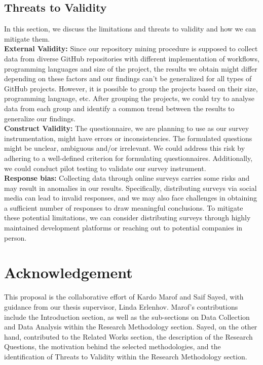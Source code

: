 \documentclass[conference]{IEEEtran}
\begin{document}
    \subsection{Threats to Validity}
        In this section, we discuss the limitations and threats to
        validity and how we can mitigate them.\\

        \textbf{External Validity:} Since our repository mining procedure is supposed to collect data from diverse GitHub repositories with different implementation of workflows, programming languages and size of the project, the results we obtain might differ depending on these factors and our findings can’t be generalized for all types of GitHub projects. However, it is possible to group the projects based on their size, programming language, etc. After grouping the projects, we could try to analyse data from each group and identify a common trend between the results to generalize our findings.\\

	\textbf{Construct Validity:} The questionnaire, we are planning to use as our survey instrumentation, might have errors or inconsistencies. The formulated questions might be unclear, ambiguous and/or irrelevant. We could address this risk by adhering to a well-defined criterion for formulating questionnaires. Additionally, we could conduct pilot testing to validate our survey instrument.\\

        \textbf{Response bias:} Collecting data through online surveys carries some risks and may result in anomalies in our results. Specifically, distributing surveys via social media can lead to invalid responses, and we may also face challenges in obtaining a sufficient number of responses to draw meaningful conclusions. To mitigate these potential limitations, we can consider distributing surveys through highly maintained development platforms or reaching out to potential companies in person. 

	


\section{Acknowledgement}

         This proposal is the collaborative effort of Kardo Marof and Saif Sayed, with guidance from our thesis supervisor, Linda Erlenhov. Marof's contributions include the Introduction section, as well as the sub-sections on Data Collection and Data Analysis within the Research Methodology section. Sayed, on the other hand, contributed to the Related Works section, the description of the Research Questions, the motivation behind the selected methodologies, and the identification of Threats to Validity within the Research Methodology section.






\vspace{12pt}
\end{document}
